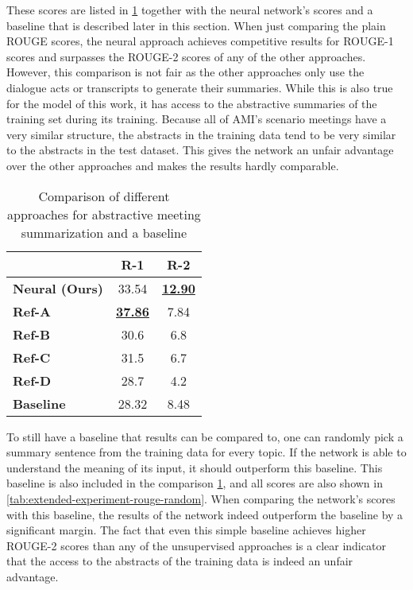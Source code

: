These scores are listed in \cref{tab:comparison} together with the neural network's scores and a baseline that is described later in this section.
When just comparing the plain ROUGE scores, the neural approach achieves competitive results for ROUGE-1 scores and surpasses the ROUGE-2 scores of any of the other approaches.
However, this comparison is not fair as the other approaches only use the dialogue acts or transcripts to generate their summaries.
While this is also true for the model of this work, it has access to the abstractive summaries of the training set during its training.
Because all of AMI's scenario meetings have a very similar structure, the abstracts in the training data tend to be very similar to the abstracts in the test dataset.
This gives the network an unfair advantage over the other approaches and makes the results hardly comparable.

\begin{table}[h]
\centering
\begin{tabular}{@{}lcc@{}}
\toprule
                       & \textbf{R-1}     & \textbf{R-2}     \\ \midrule
\textbf{Neural (Ours)} & 33.54                & \underline{\textbf{12.90}} \\
\textbf{Ref-A}         & \underline{\textbf{37.86}} & 7.84                 \\
\textbf{Ref-B}         & 30.6                 & 6.8                  \\
\textbf{Ref-C}         & 31.5                 & 6.7                  \\
\textbf{Ref-D}         & 28.7                 & 4.2                  \\
\textbf{Baseline}      & 28.32                & 8.48                 \\ \bottomrule
\end{tabular}
\caption{Comparison of different approaches for abstractive meeting summarization and a baseline}
\label{tab:comparison}
\end{table}

To still have a baseline that results can be compared to, one can randomly pick a summary sentence from the training data for every topic.
If the network is able to understand the meaning of its input, it should outperform this baseline.
This baseline is also included in the comparison \cref{tab:comparison}, and all scores are also shown in \cref{tab:extended-experiment-rouge-random}.
When comparing the network's scores with this baseline, the results of the network indeed outperform the baseline by a significant margin.
The fact that even this simple baseline achieves higher ROUGE-2 scores than any of the unsupervised approaches is a clear indicator that the access to the abstracts of the training data is indeed an unfair advantage.

